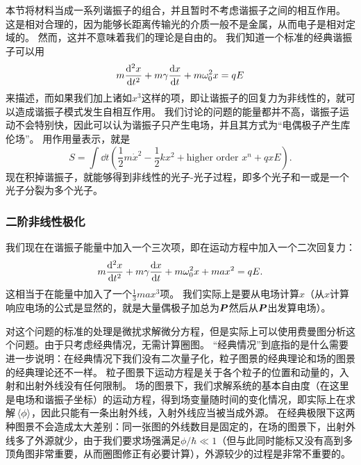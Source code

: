 \documentclass[UTF8, a4paper]{ctexart}
\begin{document}
本节将材料当成一系列谐振子的组合，并且暂时不考虑谐振子之间的相互作用。
这是相对合理的，因为能够长距离传输光的介质一般不是金属，从而电子是相对定域的。
然而，这并不意味着我们的理论是自由的。
我们知道一个标准的经典谐振子可以用
\begin{equation}
    m \dv[2]{x}{t} + m \gamma \dv{x}{t} + m \omega_0^2 x = q E
\end{equation}
来描述，而如果我们加上诸如$x^3$这样的项，即让谐振子的回复力为非线性的，就可以造成谐振子模式发生自相互作用。
我们讨论的问题的能量都并不高，谐振子运动不会特别快，因此可以认为谐振子只产生电场，并且其方式为“电偶极子产生库伦场”。
用作用量表示，就是%
\[
    S = \int \dd{t} \left( \frac{1}{2} m \dot{x}^2 - \frac{1}{2} k x^2 + \text{higher order $x^n$} + qxE \right).
\]
现在积掉谐振子，就能够得到非线性的光子-光子过程，即多个光子和一或是一个光子分裂为多个光子。

\subsubsection{二阶非线性极化}

我们现在在谐振子能量中加入一个三次项，即在运动方程中加入一个二次回复力：
\begin{equation}
    m \dv[2]{x}{t} + m \gamma \dv{x}{t} + m \omega_0^2 x + m a x^2 = q E.
    \label{eq:x3-eq}
\end{equation}
这相当于在能量中加入了一个$\frac{1}{3} m a x^3$项。
我们实际上是要从电场计算$x$（从$x$计算响应电场的公式是显然的，就是大量偶极子加总为$\vb*{P}$然后从$\vb*{P}$出发算电场）。

对这个问题的标准的处理是微扰求解微分方程，但是实际上可以使用费曼图分析这个问题。由于只考虑经典情况，无需计算圈图。
“经典情况”到底指的是什么需要进一步说明：在经典情况下我们没有二次量子化，粒子图景的经典理论和场的图景的经典理论还不一样。
粒子图景下运动方程是关于各个粒子的位置和动量的，入射和出射外线没有任何限制。
场的图景下，我们求解系统的基本自由度（在这里是电场和谐振子坐标）的运动方程，得到场变量随时间的变化情况，即实际上在求解$\expval*{\phi}$，因此只能有一条出射外线，入射外线应当被当成外源。
在经典极限下这两种图景不会造成太大差别：同一张图的外线数目是固定的，在场的图景下，出射外线多了外源就少，由于我们要求场强满足$\phi / \hbar \ll 1$（但与此同时能标又没有高到多顶角图非常重要，从而圈图修正有必要计算），外源较少的过程是非常不重要的。
\end{document}
